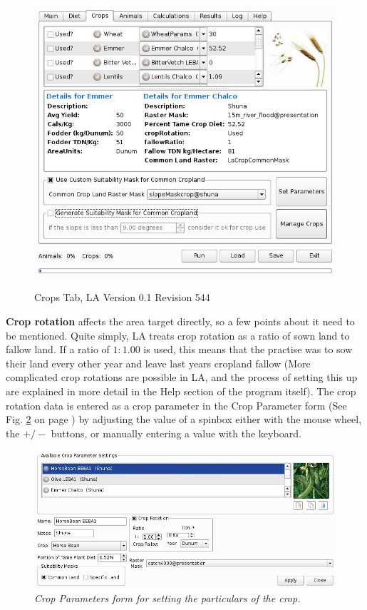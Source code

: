     \begin{figure}[htbp]
        \includegraphics[scale=.4]{./images/LanduseAnalystCrops546.jpg}
      \label{fig:crop} \caption{Crops Tab, LA Version 0.1 Revision 544}
    \end{figure}
    
  \textbf{Crop rotation} affects the area target directly, so a few points about it need to be
mentioned.  Quite simply, LA  treats crop rotation as a ratio of sown land to fallow land.  If a ratio of $1:1.00$ is used,
this means that the practise was to sow their land every other year and leave last years cropland fallow (More complicated crop rotations
are possible in LA, and the process of setting this up are explained in more detail in the Help section of the program itself).  The crop
rotation data is entered as a crop parameter in the Crop Parameter form (See Fig. \ref{fig:cropParameters} on page
\pageref{fig:cropParameters})  by adjusting the value of a spinbox either with the mouse wheel, the $+/-$ buttons, or manually entering a
value with the keyboard.
    \begin{figure}[htbp] %
        \includegraphics[scale=.27]{./images/cropParameters.jpg}
      \caption[Crop Parameters]{\label{fig:cropParameters}\textit{Crop Parameters form for setting the particulars of the crop.}}
    \end{figure}


